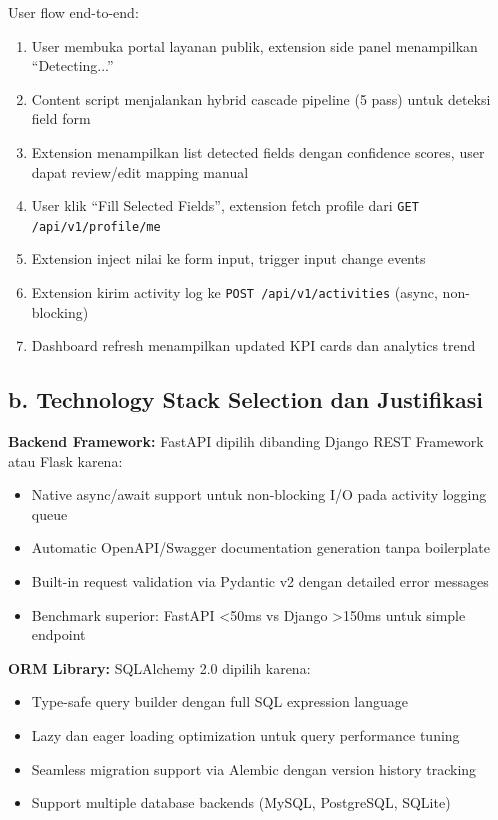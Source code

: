 \documentclass[12pt,a4paper]{article}
\begin{document}
User flow end-to-end:

\begin{enumerate}
  \item User membuka portal layanan publik, extension side panel menampilkan ``Detecting...''
  \item Content script menjalankan hybrid cascade pipeline (5 pass) untuk deteksi field form
  \item Extension menampilkan list detected fields dengan confidence scores, user dapat review/edit mapping manual
  \item User klik ``Fill Selected Fields'', extension fetch profile dari \texttt{GET /api/v1/profile/me}
  \item Extension inject nilai ke form input, trigger input change events
  \item Extension kirim activity log ke \texttt{POST /api/v1/activities} (async, non-blocking)
  \item Dashboard refresh menampilkan updated KPI cards dan analytics trend
\end{enumerate}

\subsection*{b. Technology Stack Selection dan Justifikasi}

\textbf{Backend Framework:} FastAPI dipilih dibanding Django REST Framework atau Flask karena:
\begin{itemize}
  \item Native async/await support untuk non-blocking I/O pada activity logging queue
  \item Automatic OpenAPI/Swagger documentation generation tanpa boilerplate
  \item Built-in request validation via Pydantic v2 dengan detailed error messages
  \item Benchmark superior: FastAPI \textless{}50ms vs Django \textgreater{}150ms untuk simple endpoint
\end{itemize}

\textbf{ORM Library:} SQLAlchemy 2.0 dipilih karena:
\begin{itemize}
  \item Type-safe query builder dengan full SQL expression language
  \item Lazy dan eager loading optimization untuk query performance tuning
  \item Seamless migration support via Alembic dengan version history tracking
  \item Support multiple database backends (MySQL, PostgreSQL, SQLite)
\end{itemize}
\end{document}

